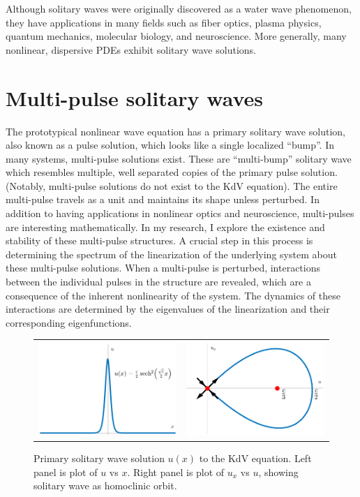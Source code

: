 \documentclass[12pt,reqno,oneside]{article}
\begin{document}
Although solitary waves were originally discovered as a water wave phenomenon, they have applications in many fields such as fiber optics, plasma physics, quantum mechanics, molecular biology, and neuroscience. More generally, many nonlinear, dispersive PDEs exhibit solitary wave solutions. 

\section*{Multi-pulse solitary waves}

The prototypical nonlinear wave equation has a primary solitary wave solution, also known as a pulse solution, which looks like a single localized ``bump''. In many systems, multi-pulse solutions exist. These are ``multi-bump'' solitary wave which resembles multiple, well separated copies of the primary pulse solution. (Notably, multi-pulse solutions do not exist to the KdV equation). 
The entire multi-pulse travels as a unit and maintains its shape unless perturbed. In addition to having applications in nonlinear optics and neuroscience, multi-pulses are interesting mathematically. In my research, I explore the existence and stability of these multi-pulse structures. A crucial step in this process is determining the spectrum of the linearization of the underlying system about these multi-pulse solutions. When a multi-pulse is perturbed, interactions between the individual pulses in the structure are revealed, which are a consequence of the inherent nonlinearity of the system. The dynamics of these interactions are determined by the eigenvalues of the linearization and their corresponding eigenfunctions.

\begin{figure}[H]
    \centering
    \begin{tabular}{cc}
        \includegraphics[width=6cm]{images/KdVsolitoneq.png} &
        \includegraphics[width=6cm]{images/KdVphaseportait.png} 
    \end{tabular}
    \caption{Primary solitary wave solution $u(x)$ to the KdV equation. Left panel is plot of $u$ vs $x$. Right panel is plot of $u_x$ vs $u$, showing solitary wave as homoclinic orbit. }
    \label{fig:kdvpp}
\end{figure}
\end{document}
